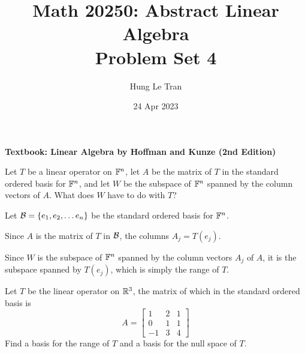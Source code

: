 \documentclass[a4paper, 10pt]{article}
\title{Math 20250: Abstract Linear Algebra \\ \large Problem Set 4}
\date{24 Apr 2023}
\author{Hung Le Tran}
\begin{document}
\maketitle
\newpage
\setcounter{section}{4}
\textbf{Textbook: Linear Algebra by Hoffman and Kunze (2nd Edition)}
\begin{problem} 
Let \(T\) be a linear operator on \(\mathbb{F}^n\), let \(A\) be the matrix of \(T\) in the standard ordered basis for \(\mathbb{F}^n\), and let \(W\) be the subspace of \(\mathbb{F}^n\) spanned by the column vectors of \(A\). What does \(W\) have to do with \(T\)?
\end{problem}
\begin{solution}
    Let \(\mathcal{B}= \{e_1, e_2, \dots e_n\}\) be the standard ordered basis for \(\mathbb{F}^n\).

    Since \(A\) is the matrix of \(T\) in \(\mathcal{B}\), the columns \(A_j = T(e_j)\).

    Since \(W\) is the subspace of \(\mathbb{F}^n\) spanned by the column vectors \(A_j\) of \(A\), it is the subspace spanned by \(T(e_j)\), which is simply the range of \(T\).
\end{solution}
\begin{problem} 
Let \(T\) be the linear operator on \(\mathbb{R}^3\), the matrix of which in the standard ordered basis is \[
    A = \left[\begin{array}{ccc}
            1  & 2 & 1 \\
            0  & 1 & 1 \\
            -1 & 3 & 4
        \end{array}\right]
\]
Find a basis for the range of \(T\) and a basis for the null space of \(T\).
\end{problem}
\end{document}
